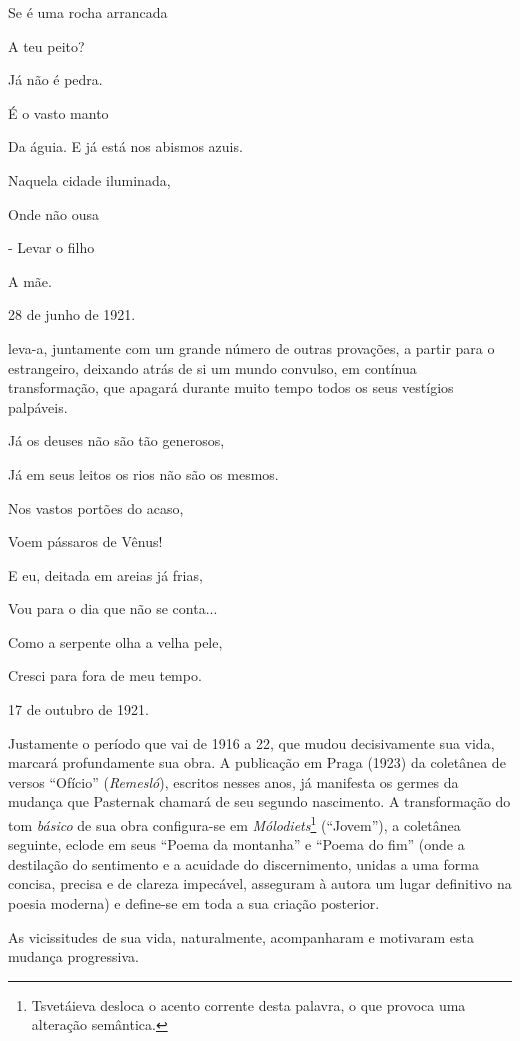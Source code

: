 Se é uma rocha arrancada

A teu peito?

Já não é pedra.

É o vasto manto

Da águia. E já está nos abismos azuis.

Naquela cidade iluminada,

Onde não ousa

- Levar o filho

A mãe.

28 de junho de 1921.

leva-a, juntamente com um grande número de outras provações, a partir
para o estrangeiro, deixando atrás de si um mundo convulso, em contínua
transformação, que apagará durante muito tempo todos os seus vestígios
palpáveis.

Já os deuses não são tão generosos,

Já em seus leitos os rios não são os mesmos.

Nos vastos portões do acaso,

Voem pássaros de Vênus!

E eu, deitada em areias já frias,

Vou para o dia que não se conta...

Como a serpente olha a velha pele,

Cresci para fora de meu tempo.

17 de outubro de 1921.

Justamente o período que vai de 1916 a 22, que mudou decisivamente sua
vida, marcará profundamente sua obra. A publicação em Praga (1923) da
coletânea de versos ``Ofício'' (\emph{Remesló}), escritos nesses anos,
já manifesta os germes da mudança que Pasternak chamará de seu segundo
nascimento. A transformação do tom \emph{básico} de sua obra
configura-se em \emph{Mólodiets}\footnote{Tsvetáieva desloca o acento
  corrente desta palavra, o que provoca uma alteração semântica.}
(``Jovem''), a coletânea seguinte, eclode em seus ``Poema da montanha''
e ``Poema do fim'' (onde a destilação do sentimento e a acuidade do
discernimento, unidas a uma forma concisa, precisa e de clareza
impecável, asseguram à autora um lugar definitivo na poesia moderna) e
define-se em toda a sua criação posterior.

As vicissitudes de sua vida, naturalmente, acompanharam e motivaram esta
mudança progressiva.

